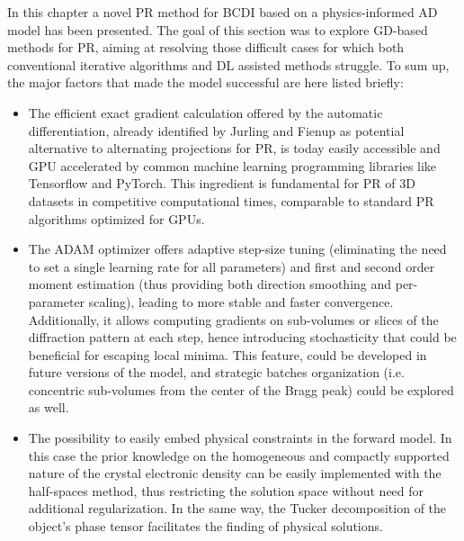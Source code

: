 In this chapter a novel PR method for BCDI based on a physics-informed AD model has been presented. The goal of this 
section was to explore GD-based methods for PR, aiming at resolving those difficult cases for which both conventional 
iterative algorithms and DL assisted methods struggle. To sum up, 
the major factors that made the model successful are here listed briefly: 
\begin{itemize}

  \item The efficient exact gradient calculation offered by the automatic differentiation, already identified by Jurling and 
  Fienup as potential alternative to alternating projections for PR, is today easily accessible and GPU accelerated by common 
  machine learning programming libraries like Tensorflow and PyTorch. This ingredient is fundamental for PR of 3D datasets 
  in competitive computational times, comparable to standard PR algorithms optimized for GPUs. 


  \item The ADAM optimizer offers adaptive step-size tuning (eliminating the need to set a single learning rate for 
  all parameters) and first and second order moment estimation (thus providing both direction smoothing and per-
  parameter scaling), leading to more stable and faster convergence. Additionally, it allows computing gradients on
  sub-volumes or slices of the diffraction pattern at each step, hence introducing stochasticity that could be 
 beneficial for escaping local minima. This feature, could be developed in future versions of the model, and strategic 
 batches organization (i.e. concentric sub-volumes from the center of the Bragg peak) could be explored as well. 


  \item The possibility to easily embed physical constraints in the forward model. In this case the prior knowledge on the 
  homogeneous and compactly supported nature of the crystal electronic density can be easily implemented with the half-spaces 
  method, thus restricting the solution space without need for additional regularization. In the same way, the Tucker 
  decomposition of the object's phase tensor facilitates the finding of physical solutions. 


\end{itemize}
